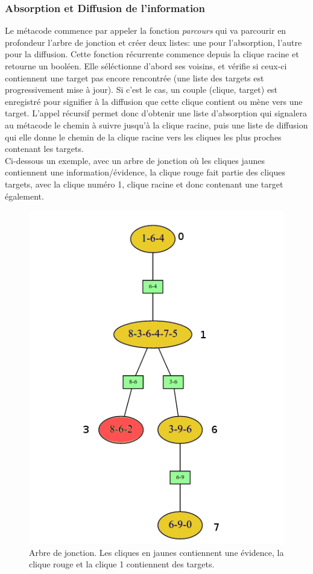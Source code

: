 \documentclass[a4paper]{article}
\begin{document}
  \subsubsection{Absorption et Diffusion de l'information}
Le métacode commence par appeler la fonction \textit{parcours} qui va parcourir en profondeur l'arbre de jonction et créer deux listes: une pour l'absorption, l'autre pour la diffusion. Cette fonction récurrente
commence depuis la clique racine et retourne un booléen. Elle séléctionne d'abord ses voisins, et vérifie si ceux-ci contiennent une target pas encore rencontrée (une liste des targets est progressivement
mise à jour). Si c'est le cas, un couple (clique, target) est enregistré pour signifier à la diffusion que cette clique contient ou mène vers une target. L'appel récursif permet donc d'obtenir une liste 
d'absorption qui signalera au métacode le chemin à suivre jusqu'à la clique racine, puis une liste de diffusion qui elle donne le chemin de la clique racine vers les cliques les plus proches contenant les targets.
\\Ci-dessous un exemple, avec un arbre de jonction où les cliques jaunes contiennent une information/évidence, la clique rouge fait partie des cliques targets, avec la clique numéro 1, clique racine et donc contenant une target également.
\begin{figure}[h!]
 \includegraphics[width=\linewidth]{Images/Parcours.png}
 \caption{Arbre de jonction. Les cliques en jaunes contiennent une évidence, la clique rouge et la clique 1 contiennent des targets.}
 \label{fig:Parcours}
\end{figure}
\end{document}
